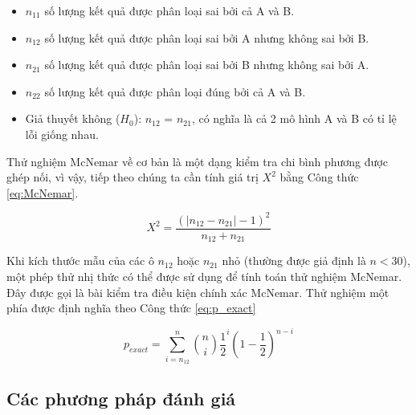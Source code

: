\documentclass[../the.tex]{subfiles}
\begin{document}
\begin {itemize}
  \item $n_{11}$ số lượng kết quả được phân loại sai bởi cả A và B.
  \item $n_{12}$ số lượng kết quả được phân loại sai bởi A nhưng không sai bởi B.
  \item $n_{21}$ số lượng kết quả được phân loại sai bởi B nhưng không sai bởi A.
  \item $n_{22}$ số lượng kết quả được phân loại đúng bởi cả A và B.
  \item Giả thuyết không ($H_0$): $n_{12}$ = $n_{21}$, có nghĩa là cả 2 mô hình A và B có tỉ lệ lỗi giống nhau.
\end {itemize}

Thử nghiệm McNemar về cơ bản là một dạng kiểm tra chi bình phương được ghép nối, vì vậy, tiếp theo chúng ta cần tính giá trị $X^2$ bằng Công thức \ref{eq:McNemar}.

\begin{equation}
    X^2 = \frac{(|n_{12} - n_{21}| - 1)^2}{n_{12} + n_{21}}
    \label{eq:McNemar}
\end{equation}

Khi kích thước mẫu của các ô $n_{12}$ hoặc $n_{21}$ nhỏ (thường được giả định là $n < 30$), một phép thử nhị thức có thể được sử dụng để tính toán thử nghiệm McNemar. Đây được gọi là bài kiểm tra điều kiện chính xác McNemar. Thử nghiệm một phía được định nghĩa theo Công thức \ref{eq:p_exact}

\begin{equation}
    p_{exact} = \sum_{i=n_{12}}^{n} \binom{n}{i} \frac{1}{2}^i (1 - \frac{1}{2})^{n-i}
    \label{eq:p_exact}
\end{equation}

\subsection{Các phương pháp đánh giá}
\end{document}
